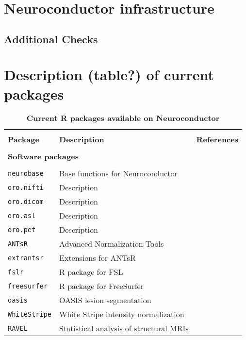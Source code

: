 \documentclass[]{elsarticle} %
\begin{document}
\section{Neuroconductor infrastructure}

\subsection{Additional Checks}\label{additional-checks}

\section{Description (table?) of current packages}




\begin{table}[!ht]
\centering
\caption{\textbf{Current R packages available on Neuroconductor}}\label{tab:packages}
\begin{tabular}{lll}
\hline \\[-2ex]
\textbf{Package} & \textbf{Description}   & \textbf{References} \\
\hline \\ [-1.5ex]
\multicolumn{3}{l}{\textbf{Software packages}}\\
\\ [-1.5ex]
\texttt{neurobase} & Base functions for Neuroconductor  &   \\
\texttt{oro.nifti} & Description  &  \citep{oro} \\
\texttt{oro.dicom} & Description  &  \citep{oro} \\
\texttt{oro.asl} & Description  &   \\
\texttt{oro.pet} & Description  &   \\
\texttt{ANTsR} & Advanced Normalization Tools  & \citep{ants} \\
\texttt{extrantsr} & Extensions for ANTsR  &  \\
\texttt{fslr} & R package for FSL  & \citep{fslr,fsl} \\
\texttt{freesurfer} & R package for FreeSurfer  & \citep{freesurfer} \\
\texttt{oasis} & OASIS lesion segmentation & \citep{oasis}\\
\texttt{WhiteStripe} & White Stripe intensity normalization  & \citep{whitestripe} \\
\texttt{RAVEL} & Statistical analysis of structural MRIs  & \citep{ravel} \\

\end{tabular}
\end{table}
\end{document}
